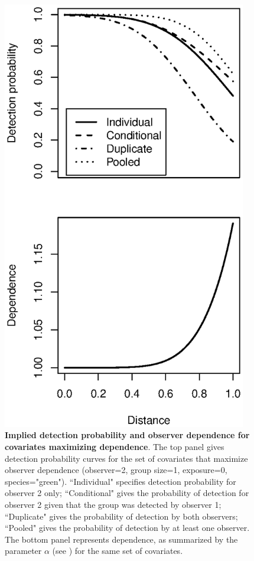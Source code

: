 \documentclass[10pt]{article}
\begin{document}
\begin{figure}
\begin{center}
\includegraphics[width=0.95\textwidth]{golf_tee_cond_det.eps}
\end{center}
\caption{{\bf Implied detection probability and observer dependence for covariates maximizing dependence}. The top panel gives detection probability curves for the set of covariates that maximize observer dependence (observer=2, group size=1, exposure=0, species="green").  ``Individual" specifies detection probability for observer 2 only; ``Conditional" gives the probability of detection for observer 2 given that the group was detected by observer 1; ``Duplicate" gives the probability of detection by both observers; ``Pooled" gives the probability of detection by at least one observer.  The bottom panel represents dependence, as summarized by the parameter $\alpha$ (see \cite{BucklandEtAl2010}) for the same set of covariates.}
\label{fig:tee_cond_det}
\end{figure}
\clearpage
\end{document}
